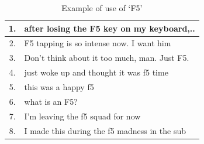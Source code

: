 \begin{table}[t]\centering   \small
    \begin{tabular}{cp{7cm}@{}}
        \hline
        1. & after losing the F5 key on my keyboard,..\\\hline
        2. & F5 tapping is so intense now. I want him\\\hline
        3. & Don't think about it too much, man. Just F5.\\\hline
        4. & just woke up and thought it was f5 time\\\hline
        5. & this was a happy f5\\\hline
        6. & what is an F5? \\\hline
        7. & I'm leaving the f5 squad for now\\\hline
        8. & I made this during the f5 madness in the sub\\\hline
        
    \end{tabular}
    \vspace*{-0.2cm}
    \caption{Example of use of `F5'}
    \vspace*{-0.2cm}
     \label{table:f5}
\end{table}

